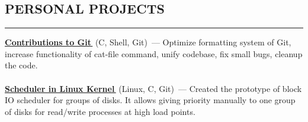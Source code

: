 \documentclass[11pt]{res} %
\let\orighref\href
\renewcommand{\href}[2]{\orighref{#1}{#2\,\faExternalLink}}
\begin{document}
 

 

\address{July 2018 \\ Saint Petersburg, Russia}

\address{\href{mailto:olyatelezhnaya@gmail.com}{olyatelezhnaya@gmail.com} \\
\href{https://github.com/telezhnaya}{github.com/telezhnaya} \\ +7 905 287 27 73}
                                             
\begin{resume}


\section{\uppercase{Personal Projects}}
\begin{spacing}{0.3}
\textcolor[RGB]{220,220,220}{\rule{\linewidth}{0.4pt}} 
\end{spacing}
\textbf{\href{https://github.com/git/git/commits?author=telezhnaya}{Contributions to Git}} (C, Shell, Git)~--- Optimize formatting system of Git, increase functionality of cat-file command, unify codebase, fix small bugs, cleanup the code. \\ \\
\textbf{\href{https://github.com/telezhnaya/linux}{Scheduler in Linux Kernel}} (Linux, C, Git)~--- Created the prototype of block IO scheduler for groups of disks. It allows giving priority manually to one group of disks for read/write processes at high load points.


\end{resume}
\end{document}
